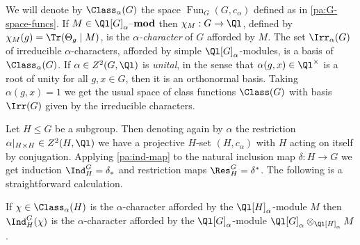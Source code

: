 \documentclass[eqthmnum,nocolour,skinny]{jt-calcs}
\DeclareMathOperator{\Fun}{Fun}
\newcommand{\lmod}[1]{\ensuremath{#1\text{--{\bf mod}}}}
\begin{document}
%

\begin{pa}
We will denote by $\Class_{\alpha}(G)$ the space $\Fun_G(G,c_{\alpha})$ defined as in \cref{pa:G-space-funcs}. If $M \in \lmod{\Ql[G]_{\alpha}}$ then $\chi_M : G \to \Ql$, defined by $\chi_M(g) = \Tr(\Theta_g \mid M)$, is the \emph{$\alpha$-character} of $G$ afforded by $M$. The set $\Irr_{\alpha}(G)$ of irreducible $\alpha$-characters, afforded by simple $\Ql[G]_{\alpha}$-modules, is a basis of $\Class_{\alpha}(G)$. If $\alpha \in Z^2(G,\Ql)$ is \emph{unital}, in the sense that $\alpha(g,x) \in \Ql^{\times}$ is a root of unity for all $g,x \in G$, then it is an orthonormal basis. Taking $\alpha(g,x) = 1$ we get the usual space of class functions $\Class(G)$ with basis $\Irr(G)$ given by the irreducible characters.
\end{pa}

\begin{pa}
Let $H \leqslant G$ be a subgroup. Then denoting again by $\alpha$ the restriction $\alpha|_{H\times H} \in Z^2(H,\Ql)$ we have a projective $H$-set $(H,c_{\alpha})$ with $H$ acting on itself by conjugation. Applying \cref{pa:ind-map} to the natural inclusion map $\delta : H \to G$ we get induction $\Ind_H^G = \delta_*$ and restriction maps $\Res_H^G = \delta^*$. The following is a straightforward calculation.
\end{pa}

\begin{lem}\label{lem:char-ind-module}
If $\chi \in \Class_{\alpha}(H)$ is the $\alpha$-character afforded by the $\Ql[H]_{\alpha}$-module $M$ then $\Ind_H^G(\chi)$ is the $\alpha$-character afforded by the $\Ql[G]_{\alpha}$-module $\Ql[G]_{\alpha} \otimes_{\Ql[H]_{\alpha}} M$.
\end{lem}
\end{document}
